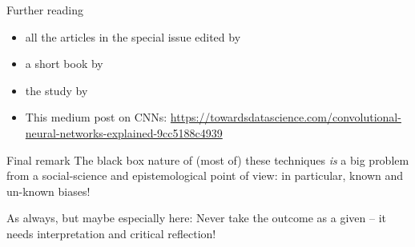 \begin{frame}{Further reading}
  \begin{itemize}
  \item all the articles in the special issue edited by \cite{Casas2022}
  \item a short book by \cite{Webbwilliams2020}
  \item the study by \cite{Araujo2020b}
  \item This medium post on CNNs:  \url{https://towardsdatascience.com/convolutional-neural-networks-explained-9cc5188c4939}
    \end{itemize}
\end{frame}



\begin{frame}{Final remark}
  The black box nature of (most of) these techniques \emph{is} a big problem from a social-science and epistemological point of view: in particular, known and un-known biases!

As always, but maybe especially here: Never take the outcome as a given -- it needs interpretation and critical reflection!

\end{frame}
